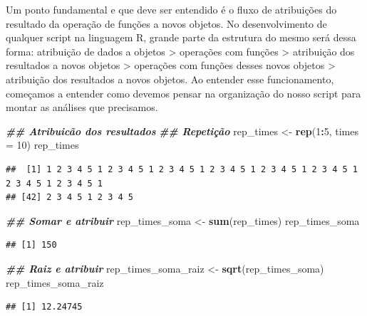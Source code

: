 \documentclass[
]{article}
\newenvironment{Shaded}{\begin{snugshade}}{\end{snugshade}}
\newcommand{\AttributeTok}[1]{\textcolor[rgb]{0.13,0.29,0.53}{#1}}
\newcommand{\DecValTok}[1]{\textcolor[rgb]{0.00,0.00,0.81}{#1}}
\newcommand{\DocumentationTok}[1]{\textcolor[rgb]{0.56,0.35,0.01}{\textbf{\textit{#1}}}}
\newcommand{\FunctionTok}[1]{\textcolor[rgb]{0.13,0.29,0.53}{\textbf{#1}}}
\newcommand{\NormalTok}[1]{#1}
\newcommand{\OtherTok}[1]{\textcolor[rgb]{0.56,0.35,0.01}{#1}}
\newcommand{\SpecialCharTok}[1]{\textcolor[rgb]{0.81,0.36,0.00}{\textbf{#1}}}
\begin{document}
Um ponto fundamental e que deve ser entendido é o fluxo de atribuições do resultado da operação de funções a novos objetos. No desenvolvimento de qualquer script na linguagem R, grande parte da estrutura do mesmo será dessa forma: atribuição de dados a objetos \textgreater{} operações com funções \textgreater{} atribuição dos resultados a novos objetos \textgreater{} operações com funções desses novos objetos \textgreater{} atribuição dos resultados a novos objetos. Ao entender esse funcionamento, começamos a entender como devemos pensar na organização do nosso script para montar as análises que precisamos.

\begin{Shaded}
\begin{Highlighting}[]
\DocumentationTok{\#\# Atribuicão dos resultados}
\DocumentationTok{\#\# Repetição}
\NormalTok{rep\_times }\OtherTok{\textless{}{-}} \FunctionTok{rep}\NormalTok{(}\DecValTok{1}\SpecialCharTok{:}\DecValTok{5}\NormalTok{, }\AttributeTok{times =} \DecValTok{10}\NormalTok{)}
\NormalTok{rep\_times}
\end{Highlighting}
\end{Shaded}

\begin{verbatim}
##  [1] 1 2 3 4 5 1 2 3 4 5 1 2 3 4 5 1 2 3 4 5 1 2 3 4 5 1 2 3 4 5 1 2 3 4 5 1 2 3 4 5 1
## [42] 2 3 4 5 1 2 3 4 5
\end{verbatim}

\begin{Shaded}
\begin{Highlighting}[]
\DocumentationTok{\#\# Somar e atribuir}
\NormalTok{rep\_times\_soma }\OtherTok{\textless{}{-}} \FunctionTok{sum}\NormalTok{(rep\_times)}
\NormalTok{rep\_times\_soma}
\end{Highlighting}
\end{Shaded}

\begin{verbatim}
## [1] 150
\end{verbatim}

\begin{Shaded}
\begin{Highlighting}[]
\DocumentationTok{\#\# Raiz e atribuir}
\NormalTok{rep\_times\_soma\_raiz }\OtherTok{\textless{}{-}} \FunctionTok{sqrt}\NormalTok{(rep\_times\_soma)}
\NormalTok{rep\_times\_soma\_raiz}
\end{Highlighting}
\end{Shaded}

\begin{verbatim}
## [1] 12.24745
\end{verbatim}
\end{document}
